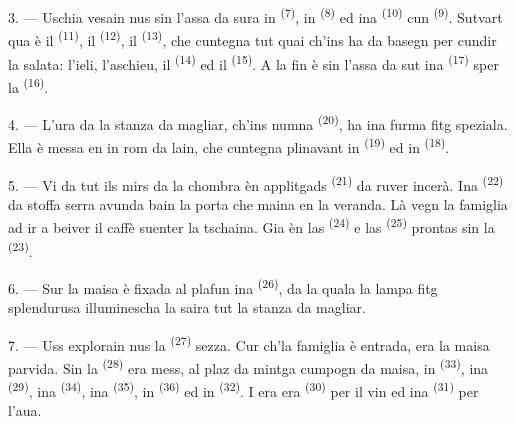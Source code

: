 3. --- Uschia vesain nus sin l'assa da sura in 
\textsuperscript{(7)}, in  \textsuperscript{(8)} ed ina 
\textsuperscript{(10)} cun  \textsuperscript{(9)}. Sutvart qua è il
 \textsuperscript{(11)}, il  \textsuperscript{(12)}, il
 \textsuperscript{(13)}, che cuntegna tut quai ch'ins ha da
basegn per cundir la salata: l'ieli, l'aschieu, il 
\textsuperscript{(14)} ed il  \textsuperscript{(15)}. A la fin è sin
l'assa da sut ina  \textsuperscript{(17)} sper la 
\textsuperscript{(16)}.

4. --- L'ura da la stanza da magliar, ch'ins numna 
\textsuperscript{(20)}, ha ina furma fitg speziala. Ella è messa en in rom da lain,
che cuntegna plinavant in  \textsuperscript{(19)} ed in
 \textsuperscript{(18)}.

\VUsaut{4.6mm}
\VUsaut{3.0mm}

5. --- Vi da tut ils mirs da la chombra èn applitgads 
\textsuperscript{(21)} da ruver incerà. Ina  \textsuperscript{(22)}
da stoffa serra avunda bain la porta che maina en la veranda. Là vegn la famiglia
ad ir a beiver il caffè suenter la tschaina. Gia èn las 
\textsuperscript{(24)} e las  \textsuperscript{(25)} prontas sin la
 \textsuperscript{(23)}.

6. --- Sur la maisa è fixada al plafun ina  \textsuperscript{(26)},
da la quala la lampa fitg splendurusa illuminescha la saira tut la stanza da
magliar.

7. --- Uss explorain nus la  \textsuperscript{(27)} sezza.
Cur ch'la famiglia è entrada, era la maisa parvida. Sin la 
\textsuperscript{(28)} era mess, al plaz da mintga cumpogn da maisa, in
 \textsuperscript{(33)}, ina  \textsuperscript{(29)},
ina  \textsuperscript{(34)}, ina 
\textsuperscript{(35)}, in  \textsuperscript{(36)} ed in
 \textsuperscript{(32)}. I era era 
\textsuperscript{(30)} per il vin ed ina  \textsuperscript{(31)} per
l'aua.

